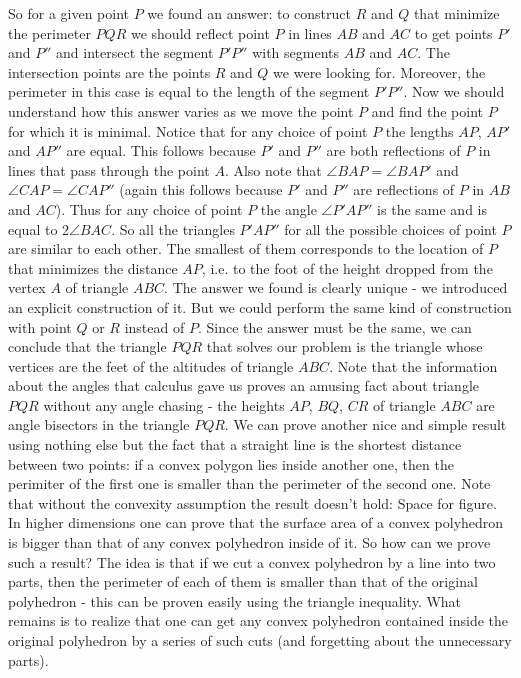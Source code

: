 So for a given point $P$ we found an answer: to construct $R$ and $Q$ that minimize the perimeter $PQR$ we should reflect point $P$ in lines $AB$ and $AC$ to get points $P'$ and $P''$ and intersect the segment $P'P''$ with segments $AB$ and $AC$. The intersection points are the points $R$ and $Q$ we were looking for. Moreover, the perimeter in this case is equal to the length of the segment $P'P''$.
Now we should understand how this answer varies as we move the point $P$ and find the point $P$ for which it is minimal.
Notice that for any choice of point $P$ the lengths $AP$, $AP'$ and $AP''$ are equal. This follows because $P'$ and $P''$ are both reflections of $P$ in lines that pass through the point $A$. Also note that $\angle BAP=\angle BAP'$ and $\angle CAP=\angle CAP''$ (again this follows because $P'$ and $P''$ are reflections of $P$ in $AB$ and $AC$). Thus for any choice of point $P$ the angle $\angle P'AP''$ is the same and is equal to $2\angle BAC$. So all the triangles $P'AP''$ for all the possible choices of point $P$ are similar to each other. The smallest of them corresponds to the location of $P$ that minimizes the distance $AP$, i.e. to the foot of the height dropped from the vertex $A$ of triangle $ABC$.
The answer we found is clearly unique - we introduced an explicit construction of it. But we could perform the same kind of construction with point $Q$ or $R$ instead of $P$. Since the answer must be the same, we can conclude that the triangle $PQR$ that solves our problem is the triangle whose vertices are the feet of the altitudes of triangle $ABC$.
Note that the information about the angles that calculus gave us proves an amusing fact about triangle $PQR$ without any angle chasing - the heights $AP$, $BQ$, $CR$ of triangle $ABC$ are angle bisectors in the triangle $PQR$.
We can prove another nice and simple result using nothing else but the fact that a straight line is the shortest distance between two points: if a convex polygon lies inside another one, then the perimiter of the first one is smaller than the perimeter of the second one.
Note that without the convexity assumption the result doesn't hold:
Space for figure.
In higher dimensions one can prove that the surface area of a convex polyhedron is bigger than that of any convex polyhedron inside of it.
So how can we prove such a result? The idea is that if we cut a convex polyhedron by a line into two parts, then the perimeter of each of them is smaller than that of the original polyhedron - this can be proven easily using the triangle inequality. What remains is to realize that one can get any convex polyhedron contained inside the original polyhedron by a series of such cuts (and forgetting about the unnecessary parts).
